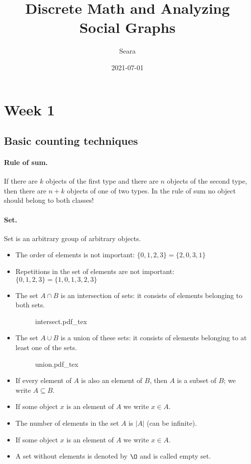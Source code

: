\documentclass{article}
\title{Discrete Math and Analyzing Social Graphs}
\date{2021-07-01}
\author{Seara}
\newcommand{\incfig}[2][1]{%
    \def\svgwidth{#1\columnwidth}
    {#2.pdf_tex}
}
\begin{document}
\maketitle
\newpage
{}

\section{Week 1}

\subsection{Basic counting techniques}

\paragraph{Rule of sum.}
If there are $k$ objects of the first type and there are $n$ objects of the second type, then there are $n+k$ objects of one of two types. In the rule of sum no object should belong to both classes!

\paragraph{Set.}
Set is an arbitrary group of arbitrary objects.
\begin{itemize}
  \item The order of elements is not important: $\{0,1,2,3\}=\{2,0,3,1\}$
  \item Repetitions in the set of elements are not important: $\{0,1,2,3\}=\{1,0,1,3,2,3\}$
  \item The set $A \cap B$ is an intersection of sets: it consists of elements belonging to both sets.
  \begin{figure}[h!]
    \centering
    \incfig{intersect}
  \end{figure}
  \newpage
  \item The set $A \cup B$ is a union of these sets: it consists of elements belonging to at least one of the sets.
  \begin{figure}[h!]
    \centering
    \incfig{union}
  \end{figure}
  \item If every element of $A$ is also an element of $B$, then $A$ is a subset of $B$; we write $A \subseteq B$.
  \item If some object $x$ is an element of $A$ we write $x \in A$.
  \item The number of elements in the set $A$ is $|A|$ (can be infinite).
  \item If some object $x$ is an element of $A$ we write $x \in A$.
  \item A set without elements is denoted by $\O$ and is called empty set.
\end{itemize}
\end{document}
